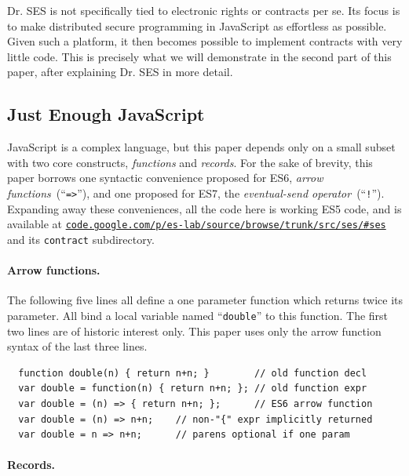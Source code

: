 \documentclass{llncs}
\newcommand{\myurl}[1]{{\href{http://#1}{\texttt{#1}}}}
\begin{document}

Dr. SES is not specifically tied to electronic rights or contracts per se. Its focus is to make distributed secure programming in JavaScript as effortless as possible. Given such a platform, it then becomes possible to implement contracts with very little code. This is precisely what we will demonstrate in the second part of this paper, after explaining Dr. SES in more detail.



\subsection{Just Enough JavaScript}

JavaScript is a complex language, but this paper depends only on a small subset with two core constructs, \emph{functions} and \emph{records}. For the sake of brevity, this paper borrows one syntactic convenience proposed for ES6, \emph{arrow functions}~(``{\tt =>}''), and one proposed for ES7, the \emph{eventual-send operator}~(``{\tt !}''). Expanding away these conveniences, all the code here is working ES5 code, and is available at \myurl{code.google.com/p/es-lab/source/browse/trunk/src/ses/\#ses} and its {\tt contract} subdirectory.

\paragraph{Arrow functions.} 

The following five lines all define a one parameter function which returns twice its parameter. All bind a local variable named ``{\tt double}'' to this function. The first two lines are of historic interest only. This paper uses only the arrow function syntax of the last three lines.

\begin{verbatim}
  function double(n) { return n+n; }        // old function decl
  var double = function(n) { return n+n; }; // old function expr
  var double = (n) => { return n+n; };      // ES6 arrow function
  var double = (n) => n+n;    // non-"{" expr implicitly returned
  var double = n => n+n;      // parens optional if one param
\end{verbatim}

\paragraph{Records.} 
\end{document}

